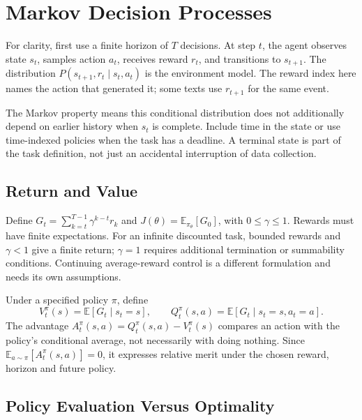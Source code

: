 \section{Markov Decision Processes}

For clarity, first use a finite horizon of $T$ decisions. At step $t$, the agent observes state $s_t$, samples action $a_t$, receives reward $r_t$, and transitions to $s_{t+1}$. The distribution $P(s_{t+1},r_t\mid s_t,a_t)$ is the environment model. The reward index here names the action that generated it; some texts use $r_{t+1}$ for the same event.

The Markov property means this conditional distribution does not additionally depend on earlier history when $s_t$ is complete. Include time in the state or use time-indexed policies when the task has a deadline. A terminal state is part of the task definition, not just an accidental interruption of data collection.

\subsection{Return and Value}

Define $G_t=\sum_{k=t}^{T-1}\gamma^{k-t}r_k$ and $J(\theta)=\mathbb E_{\pi_\theta}[G_0]$, with $0\le\gamma\le1$. Rewards must have finite expectations. For an infinite discounted task, bounded rewards and $\gamma<1$ give a finite return; $\gamma=1$ requires additional termination or summability conditions. Continuing average-reward control is a different formulation and needs its own assumptions.

Under a specified policy $\pi$, define
\begin{equation}
V_t^\pi(s)=\mathbb E[G_t\mid s_t=s],\qquad
Q_t^\pi(s,a)=\mathbb E[G_t\mid s_t=s,a_t=a].
\end{equation}
The advantage $A_t^\pi(s,a)=Q_t^\pi(s,a)-V_t^\pi(s)$ compares an action with the policy's conditional average, not necessarily with doing nothing. Since $\mathbb E_{a\sim\pi}[A_t^\pi(s,a)]=0$, it expresses relative merit under the chosen reward, horizon and future policy.

\subsection{Policy Evaluation Versus Optimality}

